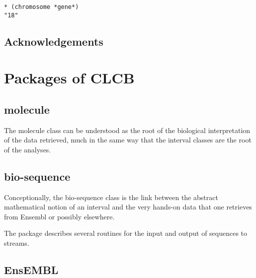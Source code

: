 \documentclass{book}
\newcommand\ensembl{EnsEMBL }
\newcommand\CLCB{CLCB }
\begin{document}
\begin{lstlisting}
* (chromosome *gene*)
"18"
\end{lstlisting}

\section{Acknowledgements}

\chapter{Packages of \CLCB}

\section{molecule}

The molecule class can be understood as the root of the biological interpretation of the data retrieved, much in the same way that the interval classes are the root of the analyses.

\begin{figure}
\begin{centering}

\end{centering}
\end{figure}

\section{bio-sequence}

Conceptionally, the bio-sequence class is the link between the abstract mathematical notion of an interval and the very hands-on data that one retrieves from Ensembl or possibly elsewhere.

\begin{figure}
\begin{centering}

\end{centering}
\end{figure}

The package describes several routines for the input and output of sequences to streams.

\section{\ensembl}
\end{document}
